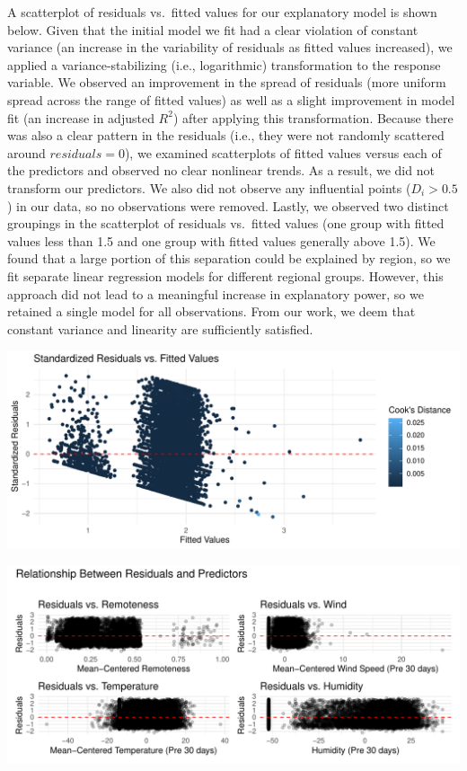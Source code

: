 \documentclass[
  letterpaper,
  DIV=11,
  numbers=noendperiod]{scrartcl}
\begin{document}
A scatterplot of residuals vs.~fitted values for our explanatory model
is shown below. Given that the initial model we fit had a clear
violation of constant variance (an increase in the variability of
residuals as fitted values increased), we applied a variance-stabilizing
(i.e., logarithmic) transformation to the response variable. We observed
an improvement in the spread of residuals (more uniform spread across
the range of fitted values) as well as a slight improvement in model fit
(an increase in adjusted \(R^2\)) after applying this transformation.
Because there was also a clear pattern in the residuals (i.e., they were
not randomly scattered around \(residuals = 0\)), we examined
scatterplots of fitted values versus each of the predictors and observed
no clear nonlinear trends. As a result, we did not transform our
predictors. We also did not observe any influential points
(\(D_i > 0.5\)) in our data, so no observations were removed. Lastly, we
observed two distinct groupings in the scatterplot of residuals
vs.~fitted values (one group with fitted values less than 1.5 and one
group with fitted values generally above 1.5). We found that a large
portion of this separation could be explained by region, so we fit
separate linear regression models for different regional groups.
However, this approach did not lead to a meaningful increase in
explanatory power, so we retained a single model for all observations.
From our work, we deem that constant variance and linearity are
sufficiently satisfied.

\includegraphics{written-report_files/figure-pdf/residuals-fitted-vals-plot-1.pdf}

\includegraphics{written-report_files/figure-pdf/residuals-fitted-vals-plot-2.pdf}
\end{document}
